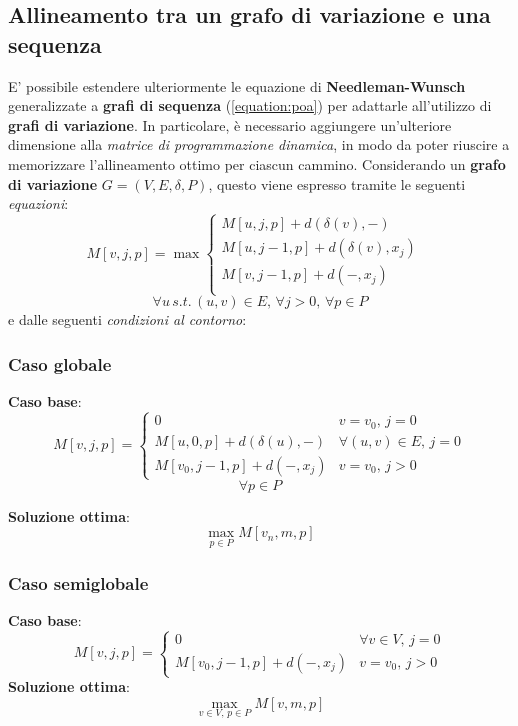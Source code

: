 \subsection{Allineamento tra un grafo di variazione e una sequenza}
    E' possibile estendere ulteriormente le equazione di \textbf{Needleman-Wunsch} generalizzate a \textbf{grafi di sequenza} (\ref{equation:poa}) per adattarle all'utilizzo di \textbf{grafi di variazione}. In particolare, è necessario aggiungere un'ulteriore dimensione alla \emph{matrice di programmazione dinamica}, in modo da poter riuscire a memorizzare l'allineamento ottimo per ciascun cammino. Considerando un \textbf{grafo di variazione} $G = (V, E, \delta, P)$, questo viene espresso tramite le seguenti \emph{equazioni}:
     \begin{equation}
        M[v, j, p] = \max \begin{cases}
            M[u, j, p] + d(\delta(v), -) & \\
            M[u, j - 1, p] + d(\delta(v), x_j) & \\
            M[v, j - 1, p] + d(-, x_j) & \\
        \end{cases}
    \label{equation:variation-graph}
    \end{equation}
    $$\forall u \, s.t. \, (u,v) \in E, \, \forall j > 0, \, \forall p \in P $$
    \vspace{10pt}
     e dalle seguenti \emph{condizioni al contorno}:
\subsubsection{Caso globale}
    \textbf{Caso base}:
    \begin{equation}
        M[v, j, p] = \begin{cases}
            0 & v = v_0, \, j = 0 \\
            M[u, 0, p] + d(\delta(u), -)& \forall (u, v) \in E, \, j = 0 \\
            M[v_0, j - 1, p] + d(-, x_j)& v = v_0, \, j > 0
        \end{cases}
    \end{equation}
    $$\forall p \in P$$

    \textbf{Soluzione ottima}: $$\max_{p \in P} M[v_n, m, p]$$
    
\subsubsection{Caso semiglobale}
    \textbf{Caso base}:
    \begin{equation}
        M[v, j, p] = \begin{cases}
            0 & \forall v \in V, \, j = 0 \\
            M[v_0, j - 1, p] + d(-, x_j) & v = v_0, \, j > 0
        \end{cases}
    \end{equation}
    \textbf{Soluzione ottima}:
    $$\max_{v \in V, \, p \in P} M[v, m, p]$$

